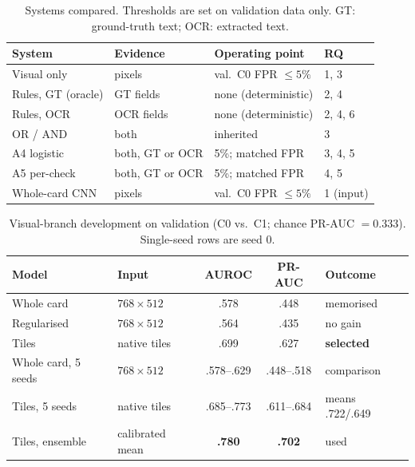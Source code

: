 \documentclass[12pt]{article}
\begin{document}
\clearpage
\begin{table}[H]
\caption{Systems compared. Thresholds are set on validation data only.
GT: ground-truth text; OCR: extracted text.}
\label{tab:systems}
\centering
\scriptsize
\setlength{\tabcolsep}{2.8pt}
\renewcommand{\arraystretch}{1.12}
\begin{adjustbox}{max width=\linewidth}
\begin{tabular}{@{}p{3.2cm}p{2.9cm}p{3.6cm}l@{}}
\toprule
System & Evidence & Operating point & RQ \\
\midrule
Visual only        & pixels            & val.\ C0 FPR $\le5\%$ & 1, 3 \\
Rules, GT (oracle) & GT fields         & none (deterministic)  & 2, 4 \\
Rules, OCR         & OCR fields        & none (deterministic)  & 2, 4, 6 \\
OR / AND           & both              & inherited             & 3 \\
A4 logistic        & both, GT or OCR   & 5\%; matched FPR      & 3, 4, 5 \\
A5 per-check       & both, GT or OCR   & 5\%; matched FPR      & 4, 5 \\
Whole-card CNN     & pixels            & val.\ C0 FPR $\le5\%$ & 1 (input) \\
\bottomrule
\end{tabular}
\end{adjustbox}
\end{table}
\clearpage
\begin{table}[H]
\caption{Visual-branch development on validation (C0 vs.\ C1; chance
PR-AUC $=0.333$). Single-seed rows are seed 0.}
\label{tab:dev}
\centering
\scriptsize
\setlength{\tabcolsep}{3pt}
\renewcommand{\arraystretch}{1.12}
\begin{adjustbox}{max width=\linewidth}
\begin{tabular}{@{}l l c c l@{}}
\toprule
Model & Input & AUROC & PR-AUC & Outcome \\
\midrule
Whole card          & $768{\times}512$ & .578 & .448 & memorised \\
Regularised         & $768{\times}512$ & .564 & .435 & no gain \\
Tiles               & native tiles     & .699 & .627 & \textbf{selected} \\
\addlinespace[4pt]
Whole card, 5 seeds & $768{\times}512$ & .578--.629 & .448--.518 & comparison \\
Tiles, 5 seeds      & native tiles     & .685--.773 & .611--.684 & means .722/.649 \\
Tiles, ensemble     & calibrated mean  & \textbf{.780} & \textbf{.702} & used \\
\bottomrule
\end{tabular}
\end{adjustbox}
\end{table}
\end{document}
